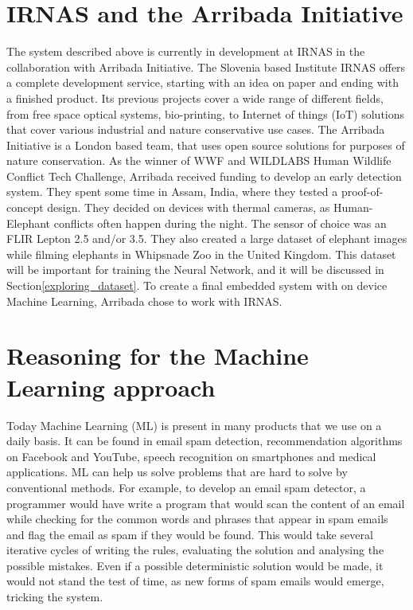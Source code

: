 \section{ IRNAS and the Arribada Initiative}\label{arribada_init}

The system described above is currently in development at IRNAS in the collaboration with Arribada Initiative.
The Slovenia based Institute IRNAS offers a complete development service, starting with an idea on paper and ending with a finished product. 
Its previous projects cover a wide range of different fields, from free space optical systems, bio-printing, to Internet of things (IoT) solutions that cover various industrial and nature conservative use cases.
The Arribada Initiative is a London based team, that uses open source solutions for purposes of nature conservation.
As the winner of WWF and WILDLABS Human Wildlife Conflict Tech Challenge\cite{wildlabs-winners}, Arribada received funding to develop an early detection system.
They spent some time in Assam, India, where they tested a proof-of-concept design\cite{arribada-assam}.
They decided on devices with thermal cameras, as Human-Elephant conflicts often happen during the night.
The sensor of choice was an FLIR Lepton 2.5 and/or 3.5.
They also created a large dataset of elephant images while filming elephants in Whipsnade Zoo in the United Kingdom. 
This dataset will be important for training the Neural Network, and it will be discussed in Section\ref{exploring_dataset}.
To create a final embedded system with on device Machine Learning, Arribada chose to work with IRNAS.


\section{ Reasoning for the Machine Learning approach}

Today Machine Learning (ML) is present in many products that we use on a daily basis.
It can be found in email spam detection, recommendation algorithms on Facebook and YouTube, speech recognition on smartphones and medical applications.
ML can help us solve problems that are hard to solve by conventional methods.
For example, to develop an email spam detector, a programmer would have write a program that would scan the content of an email while checking for the common words and phrases that appear in spam emails and flag the email as spam if they would be found.
This would take several iterative cycles of writing the rules, evaluating the solution and analysing the possible mistakes. 
Even if a possible deterministic solution would be made, it would not stand the test of time, as new forms of spam emails would emerge, tricking the system.

